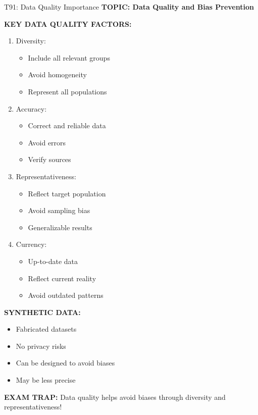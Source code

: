 \documentclass[8pt]{beamer}
\begin{document}
	\begin{frame}{T91: Data Quality Importance}
		\fontsize{6.5}{7.5}\selectfont
		\textbf{TOPIC: Data Quality and Bias Prevention}
		
		\vspace{0.1cm}
		\textbf{KEY DATA QUALITY FACTORS:}
		\begin{enumerate}
			\item \textcolor{myblue}{Diversity:}
			\begin{itemize}
				\item Include all relevant groups
				\item Avoid homogeneity
				\item Represent all populations
			\end{itemize}
			\item \textcolor{myblue}{Accuracy:}
			\begin{itemize}
				\item Correct and reliable data
				\item Avoid errors
				\item Verify sources
			\end{itemize}
			\item \textcolor{myblue}{Representativeness:}
			\begin{itemize}
				\item Reflect target population
				\item Avoid sampling bias
				\item Generalizable results
			\end{itemize}
			\item \textcolor{myblue}{Currency:}
			\begin{itemize}
				\item Up-to-date data
				\item Reflect current reality
				\item Avoid outdated patterns
			\end{itemize}
		\end{enumerate}
		
		\vspace{0.1cm}
		\textbf{SYNTHETIC DATA:}
		\begin{itemize}
			\item Fabricated datasets
			\item No privacy risks
			\item Can be designed to avoid biases
			\item May be less precise
		\end{itemize}
		
		\textcolor{myred}{\textbf{EXAM TRAP:}} Data quality helps \textcolor{myblue}{avoid biases} through diversity and representativeness!
	\end{frame}
	
\end{document}
